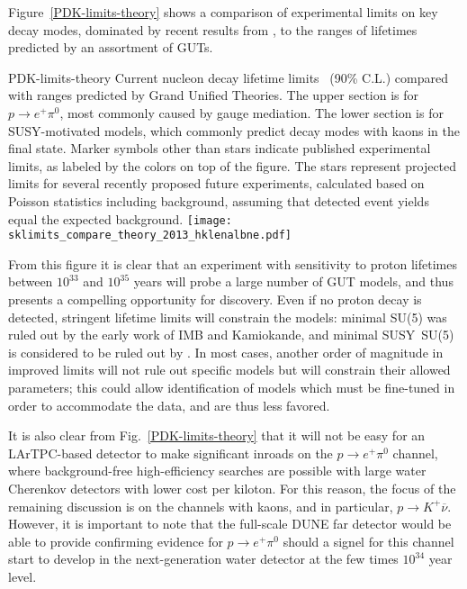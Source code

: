 Figure~\ref{PDK-limits-theory} shows a comparison of experimental
limits on key decay modes, dominated by recent results from \superk, to the
ranges of lifetimes predicted by an assortment of GUTs. 
\begin{cdrfigure}
                 {PDK-limits-theory}
                 {Current nucleon decay lifetime 
                  limits~\cite{Beringer:1900zz,Nishino:2012ipa} (90\% C.L.)
                  compared with ranges predicted by 
                  Grand Unified Theories. The upper section is for
                  $p \rightarrow e^+ \pi^0$, most commonly caused by 
                  gauge mediation.  The lower section is for SUSY-motivated 
                  models, which commonly predict decay modes with kaons 
                  in the final state.  Marker symbols other than stars 
                  indicate published experimental limits, 
                  as labeled by the 
                  colors on top of the figure.  The stars represent projected 
                  limits for several recently proposed future experiments,   
                  calculated based on Poisson statistics including background, 
                  assuming that detected event yields equal the expected 
                  background.}
\texttt{[image: sklimits\_compare\_theory\_2013\_hklenalbne.pdf]}
\end{cdrfigure}
%
From this figure it is clear that an experiment with sensitivity to proton lifetimes
between $10^{33}$ and $10^{35}$ years will probe a large number of GUT models, and 
thus presents a compelling opportunity for discovery.
Even if no proton decay is detected, stringent lifetime limits will constrain 
the models: minimal SU(5) was ruled out by the early work of IMB and
Kamiokande, and minimal SUSY~SU(5) is considered to be ruled out by \superk.
In most cases, another order of magnitude in improved limits will not rule out
specific models but will constrain their allowed parameters;
this could allow identification of models which must be fine-tuned
in order to accommodate the data, and are thus less favored.

It is also clear from Fig.~\ref{PDK-limits-theory} that it will not be easy for 
an LArTPC-based detector to make significant inroads on the $p \rightarrow e^+ \pi^0$ 
channel, where background-free high-efficiency searches are possible with large 
water Cherenkov detectors with lower cost per kiloton.  For this reason, the 
focus of the remaining discussion is on the channels with kaons, and in particular, 
$p \rightarrow K^+ \overline{\nu}$.  However, it is important to note that 
the full-scale DUNE far detector would be able to provide confirming evidence 
for $p \rightarrow e^+ \pi^0$ should a signel for this channel start to develop 
in the next-generation water detector at the few times $10^{34}$ year level. 


